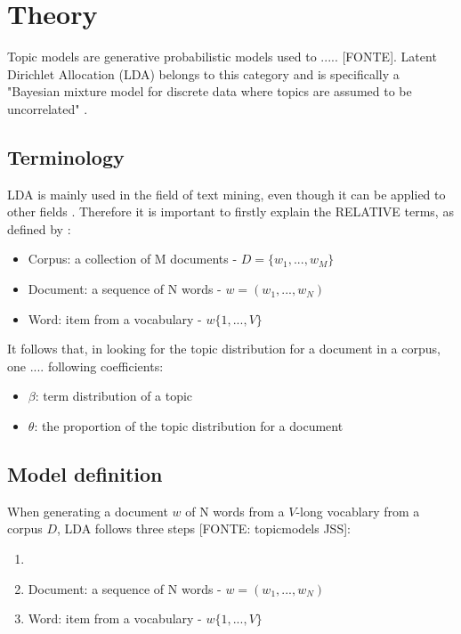 \chapter{Theory}

Topic models are generative probabilistic models used to ..... [FONTE]. Latent Dirichlet Allocation (LDA) belongs to this category and is specifically a "Bayesian mixture model for discrete data where topics are assumed to be uncorrelated" \citep{hornik2011topicmodels}.

\section{Terminology}
LDA is mainly used in the field of text mining, even though it can be applied to other fields \citep{blei2003latent}. Therefore it is important to firstly explain the RELATIVE terms, as defined by \cite{blei2003latent}:
\begin{itemize}
\item Corpus: a collection of M documents - $D = \{w_1, ..., w_M\}$
\item Document: a sequence of N words - $w = (w_1, ..., w_N)$
\item Word: item from a vocabulary - $w \{1, ..., V\}$
\end{itemize}

It follows that, in looking for the topic distribution for a document in a corpus, one .... following coefficients:
\begin{itemize}
\item $\beta$: term distribution of a topic
\item $\theta$: the proportion of the topic distribution for a document
\end{itemize}


\section{Model definition}
When generating a document $w$ of N words from a $V$-long vocablary from a corpus $D$, LDA follows three steps [FONTE: topicmodels JSS]:
\begin{enumerate}
\item 
\item Document: a sequence of N words - $w = (w_1, ..., w_N)$
\item Word: item from a vocabulary - $w \{1, ..., V\}$
\end{enumerate}
